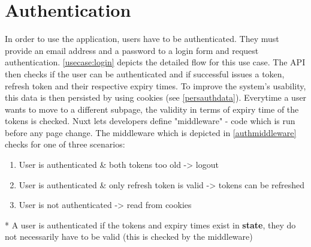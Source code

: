 
\section{Authentication}


In order to use the application, users have to be authenticated. They must provide an email address and a password to a login form and request authentication. \autoref{usecase:login} depicts the detailed flow for this use case. The API then checks if the user can be authenticated and if successful issues a token, refresh token and their respective expiry times. To improve the system's usability, this data is then persisted by using cookies (see \autoref{persauthdata}). Everytime a user wants to move to a different subpage, the validity in terms of expiry time of the tokens is checked. Nuxt lets developers define "middleware" - code which is run before any page change. The middleware which is depicted in \autoref{authmiddleware} checks for one of three scenarios:

\begin{enumerate}
  \item User is authenticated \& both tokens too old -> logout
  \item User is authenticated \& only refresh token is valid -> tokens can be refreshed
  \item User is not authenticated -> read from cookies
\end{enumerate}

* A user is authenticated if the tokens and expiry times exist in \textbf{state}, they do not necessarily have to be valid (this is checked by the middleware) 

